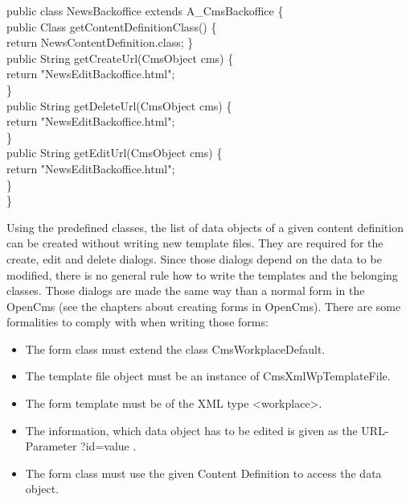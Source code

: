 \begin{java}
public class NewsBackoffice extends A\_CmsBackoffice \{\\
\jtaba        public Class getContentDefinitionClass() \{\\
\jtabb                  return NewsContentDefinition.class;
\jtaba        \}\\
\jtaba        public String getCreateUrl(CmsObject cms) \{\\
\jtabb                return "NewsEditBackoffice.html";\\
\jtaba        \}\\
\jtaba        public String getDeleteUrl(CmsObject cms) \{\\
\jtabb                return "NewsEditBackoffice.html";\\
\jtaba        \}\\
\jtaba        public String getEditUrl(CmsObject cms) \{\\
\jtabb                return "NewsEditBackoffice.html";\\
\jtaba        \}\\
\}\\
\end{java}

Using the predefined classes, the list of data objects of a given
content definition can be created without writing new template files.
They are required for the create, edit and delete dialogs. Since those
dialogs depend on the data to be modified, there is no general rule how
to write the templates and the belonging classes. Those dialogs are made
the same way than a normal form in the OpenCms (see the chapters about
creating forms in OpenCms). There are some formalities to comply with
when writing those forms:
\begin{itemize}
\item The form class must extend the class CmsWorkplaceDefault.
\item The template file object must be an instance of
CmsXmlWpTemplateFile.
\item The form template must be of the XML type <workplace>.
\item The information, which data object has to be edited is given as
the URL-Parameter ?id=value .
\item The form class must use the given Content Definition to access
the data object.
\end{itemize}

